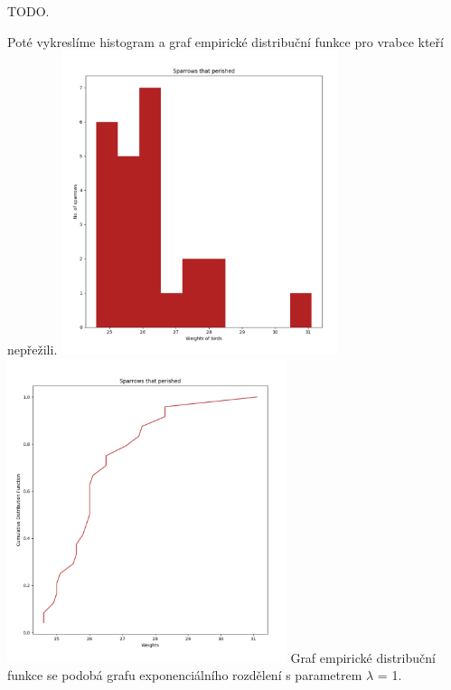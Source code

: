 \documentclass[12pt,a4paper]{article}
\begin{document}
TODO.\par \bigskip

Poté vykreslíme histogram a graf empirické distribuční funkce pro vrabce kteří nepřežili.
\includegraphics[height=3.5in]{diedHist}
\includegraphics[height=3.5in]{diedDist}
Graf empirické distribuční funkce se podobá grafu exponenciálního rozdělení s parametrem $\lambda$ = 1.\par \bigskip
\end{document}

